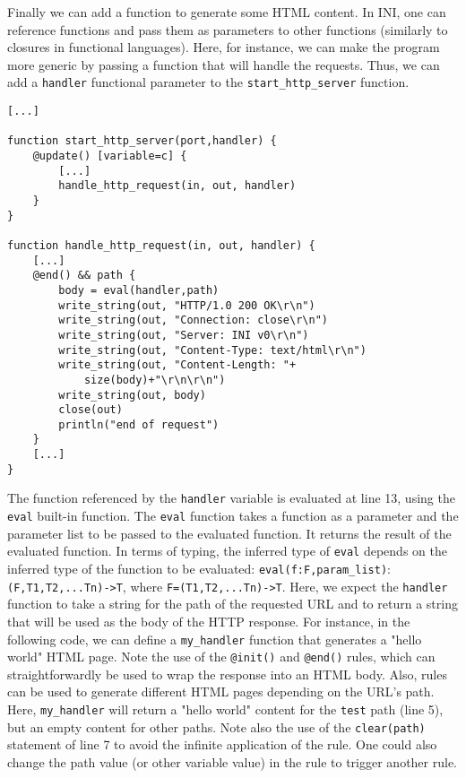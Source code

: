 \documentclass[11pt]{report}
\begin{document}
Finally we can add a function to generate some HTML content. In INI, one can reference functions and pass them as parameters to other functions (similarly to closures in functional languages). Here, for instance, we can make the program more generic by passing a function that will handle the requests. Thus, we can add a \texttt{handler} functional parameter to the \texttt{start\_http\_server} function.

\begin{lstlisting}
[...]

function start_http_server(port,handler) {
	@update() [variable=c] {
		[...]
		handle_http_request(in, out, handler)
	}		
}

function handle_http_request(in, out, handler) {
	[...]
	@end() && path {
		body = eval(handler,path)
		write_string(out, "HTTP/1.0 200 OK\r\n")
		write_string(out, "Connection: close\r\n")
		write_string(out, "Server: INI v0\r\n")
		write_string(out, "Content-Type: text/html\r\n")
		write_string(out, "Content-Length: "+
			size(body)+"\r\n\r\n")
		write_string(out, body)
		close(out)
		println("end of request")		
	}
	[...]
}
\end{lstlisting}

The function referenced by the \texttt{handler} variable is evaluated at line 13, using the \texttt{eval} built-in function. The \texttt{eval} function takes a function as a parameter and the parameter list to be passed to the evaluated function. It returns the result of the evaluated function. In terms of typing, the inferred type of \texttt{eval} depends on the inferred type of the function to be evaluated: \texttt{eval(f:F,param\_list)}:\texttt{(F,T1,T2,...Tn)->T}, where \texttt{F=(T1,T2,...Tn)->T}. Here, we expect the \texttt{handler} function to take a string for the path of the requested URL and to return a string that will be used as the body of the HTTP response. For instance, in the following code, we can define a \texttt{my\_handler} function that generates a "hello world" HTML page. Note the use of the \texttt{@init()} and \texttt{@end()} rules, which can straightforwardly be used to wrap the response into an HTML body. Also, rules can be used to generate different HTML pages depending on the URL's path. Here, \texttt{my\_handler} will return a "hello world" content for the \texttt{test} path (line 5), but an empty content for other paths. Note also the use of the \texttt{clear(path)} statement of line 7 to avoid the infinite application of the rule. One could also change the path value (or other variable value) in the rule to trigger another rule.
\end{document}
